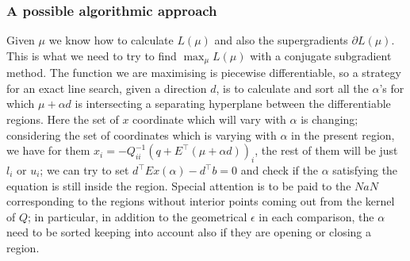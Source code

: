 \documentclass[twoside]{mfitjournal}
\begin{document}
\subsubsection*{A possible algorithmic approach}
Given $\mu$ we know how to calculate $L(\mu)$ and also the supergradients $\partial L(\mu)$.
This is what we need to try to find $\max_\mu L(\mu)$ with a conjugate subgradient method. The function we are maximising is piecewise differentiable, so a strategy for an exact line search, given a direction $d$, is to calculate and sort all the $\alpha$'s for which $\mu + \alpha d$ is intersecting a separating hyperplane between the differentiable regions. Here the set of $x$ coordinate which will vary with $\alpha$ is changing; considering the set of coordinates which is varying with $\alpha$ in the present region, we have for them $x_i = -Q_{i i}^{-1}(q + E^\intercal (\mu + \alpha d))_i$, the rest of them will be just $l_i$ or $u_i$; we can try to set $d^\intercal E x(\alpha) - d^\intercal b = 0$ and check if the $\alpha$ satisfying the equation is still inside the region.
Special attention is to be paid to the $NaN$ corresponding to the regions without interior points coming out from the kernel of $Q$; in particular, in addition to the geometrical $\epsilon$ in each comparison, the $\alpha$ need to be sorted keeping into account also if they are opening or closing a region.
\end{document}
